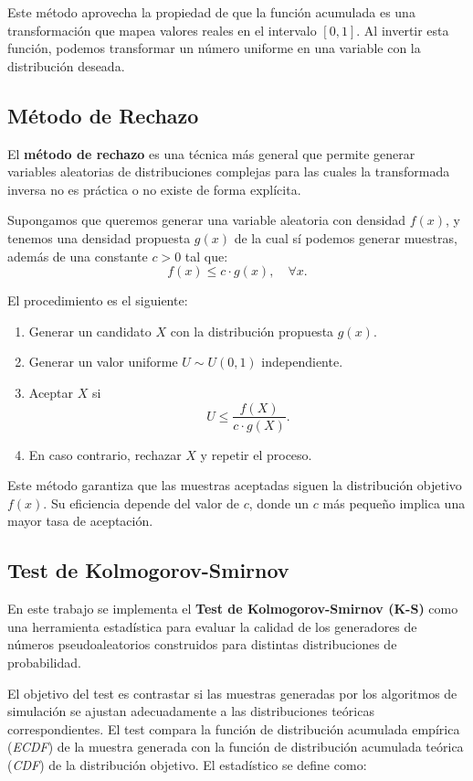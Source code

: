 \documentclass{article}
\begin{document}
Este método aprovecha la propiedad de que la función acumulada es una transformación que mapea valores reales en el intervalo $[0,1]$. Al invertir esta función, podemos transformar un número uniforme en una variable con la distribución deseada.

\subsection{Método de Rechazo}

El \textbf{método de rechazo} es una técnica más general que permite generar variables aleatorias de distribuciones complejas para las cuales la transformada inversa no es práctica o no existe de forma explícita.

Supongamos que queremos generar una variable aleatoria con densidad $f(x)$, y tenemos una densidad propuesta $g(x)$ de la cual sí podemos generar muestras, además de una constante $c > 0$ tal que:
\begin{equation}
    f(x) \leq c \cdot g(x), \quad \forall x.
\end{equation}

El procedimiento es el siguiente:

\begin{enumerate}
    \item Generar un candidato $X$ con la distribución propuesta $g(x)$.
    \item Generar un valor uniforme $U \sim U(0,1)$ independiente.
    \item Aceptar $X$ si 
    \[
        U \leq \frac{f(X)}{c \cdot g(X)}.
    \]
    \item En caso contrario, rechazar $X$ y repetir el proceso.
\end{enumerate}

Este método garantiza que las muestras aceptadas siguen la distribución objetivo $f(x)$. Su eficiencia depende del valor de $c$, donde un $c$ más pequeño implica una mayor tasa de aceptación.

\subsection{Test de Kolmogorov-Smirnov}
En este trabajo se implementa el \textbf{Test de Kolmogorov-Smirnov (K-S)} como una herramienta estadística para evaluar la calidad de los generadores de números pseudoaleatorios construidos para distintas distribuciones de probabilidad.

El objetivo del test es contrastar si las muestras generadas por los algoritmos de simulación se ajustan adecuadamente a las distribuciones teóricas correspondientes. El test compara la función de distribución acumulada empírica (\emph{ECDF}) de la muestra generada con la función de distribución acumulada teórica (\emph{CDF}) de la distribución objetivo. El estadístico se define como:
\end{document}
